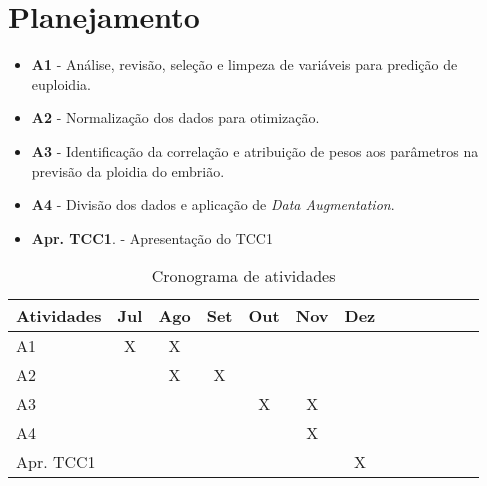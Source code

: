 \chapter[Planejamento]{Planejamento}

\begin{itemize}
    \item \textbf{A1} - Análise, revisão, seleção e limpeza de variáveis para predição de euploidia.
    \item \textbf{A2} - Normalização dos dados para otimização.
    \item \textbf{A3} - Identificação da correlação e atribuição de pesos aos parâmetros na previsão da ploidia do embrião.
    \item \textbf{A4} - Divisão dos dados e aplicação de \textit{Data Augmentation}.
    \item \textbf{Apr. TCC1}. - Apresentação do TCC1
\end{itemize}


\renewcommand{\arraystretch}{1.2}
\begin{table}[ht]
    \centering
    \caption{Cronograma de atividades}
    \begin{tabular}{|l|c|c|c|c|c|c|c|c|c|c|c|c|}
    \hline
    \cellcolor[HTML]{008940}\textbf{Atividades} & \cellcolor[HTML]{008940}\textbf{Jul}&\cellcolor[HTML]{008940}\textbf{Ago} & \cellcolor[HTML]{008940}\textbf{Set} & \cellcolor[HTML]{008940}\textbf{Out} & \cellcolor[HTML]{008940}\textbf{Nov} & \cellcolor[HTML]{008940}\textbf{Dez} \\ \hline
    A1  & X & X &   &   &   &   \\ \hline
    A2  &   & X & X &   &   &   \\ \hline
    A3  &   &   &   & X & X  &  \\ \hline
    A4  &   &   &   &   & X &   \\ \hline
    Apr. TCC1 &   &   &   &  &  & X \\ \hline
    \end{tabular}
    
    \label{tab:cronograma}
\end{table}